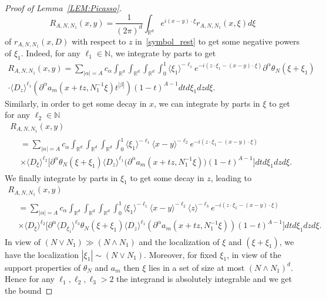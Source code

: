 \documentclass[AHL,Unicode,longabstracts,published]{cedram}
\newcommand{\R}{\mathbb{R}}
\newcommand{\N}{\mathbb{N}}
\newcommand{\jb}[1] {\langle #1 \rangle}
\begin{document}
\begin{proof}[Proof of Lemma~\ref{LEM:Picasso}]
\begin{equation*}
R_{A,N,N_1}(x,y)=\frac{1}{(2\pi)^d}\int_{\R^d}e^{i(x-y)\cdot\xi}r_{A,N,N_1}(x,\xi)d\xi
\end{equation*}
of $r_{A,N,N_1}(x,D)$ with respect to $z$ in~\eqref{symbol_rest} to get some negative powers of $\xi_1$. Indeed, for any $\ell_1\in\N$, we integrate by parts to get
\begin{multline*}
R_{A,N,N_1}(x,y)=\sum_{|\alpha|=A}c_{\alpha}\int_{\R^d}\int_{\R^d}\int_{\R^d}\int_0^1\jb{\xi_1}^{-\ell_1}e^{-i(z\cdot\xi_1-(x-y)\cdot\xi)}\partial^{\alpha}\theta_N(\xi+\xi_1)\\
\cdot\jb{D_z}^{\ell_1}\left(\partial^{\alpha}a_{m}\left(x+tz,N_1^{-1}\xi\right)t^{|\beta|}\right)(1-t)^{A-1}dtd\xi_1 dzd\xi.
\end{multline*}
Similarly, in order to get some decay in $x$, we can integrate by parts in $\xi$ to get for any $\ell_2\in\N$
\begin{multline*}
R_{A,N,N_1}(x,y)\\
\begin{aligned}
&=\sum_{|\alpha|=A}c_{\alpha}\int_{\R^d}\int_{\R^d}\int_{\R^d}\int_0^1\jb{\xi_1}^{-\ell_1}\jb{x-y}^{-\ell_2}e^{-i(z\cdot\xi_1-(x-y)\cdot\xi)}\\
&\times\jb{D_{\xi}}^{\ell_2}\Big[\partial^{\alpha}\theta_N(\xi+\xi_1)\jb{D_z}^{\ell_1}\big(\partial^{\alpha}a_{m}\left(x+tz,N_1^{-1}\xi\right)\big)(1-t)^{A-1}\Big]dtd\xi_1 dzd\xi.
\end{aligned}
\end{multline*}
We finally integrate by parts in $\xi_1$ to get some decay in $z$, leading to
\begin{multline*}
R_{A,N,N_1}(x,y)\\
\begin{aligned}
&=\sum_{|\alpha|=A}c_{\alpha}\int_{\R^d}\int_{\R^d}\int_{\R^d}\int_0^1\jb{\xi_1}^{-\ell_1}\jb{x-y}^{-\ell_2}\jb{z}^{-\ell_3}e^{-i(z\cdot\xi_1-(x-y)\cdot\xi)}\\
&\times\jb{D_{\xi}}^{\ell_2}\Big[\partial^{\alpha}\jb{D_{\xi_1}}^{\ell_3}\theta_N(\xi+\xi_1)\jb{D_z}^{\ell_1}\left(\partial^{\alpha}a_{m}\left(x+tz,N_1^{-1}\xi\right)\right)(1-t)^{A-1}\Big]dtd\xi_1 dzd\xi.
\end{aligned}
\end{multline*}
In view of $(N\vee N_1)\gg (N\wedge N_1)$ and the localization of $\xi$ and $(\xi+\xi_1)$, we have the localization $|\xi_1|\sim (N\vee N_1)$. Moreover, for fixed $\xi_1$, in view of the support properties of $\theta_N$ and $a_m$ then $\xi$ lies in a set of size at most $(N\wedge N_1)^d$. Hence for any $\ell_1,\ell_2,\ell_3>2$ the integrand is absolutely integrable and we get the bound

\end{proof}
\end{document}
